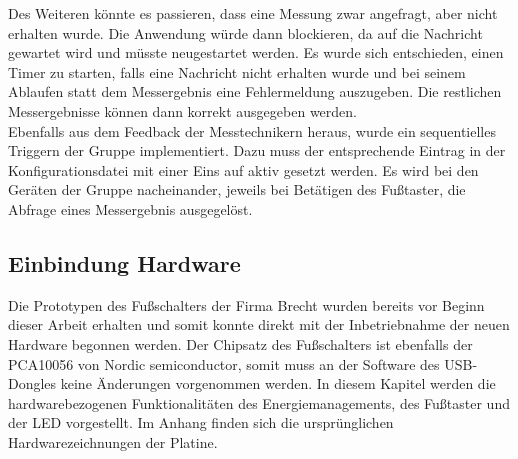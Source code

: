 Des Weiteren könnte es passieren, dass eine Messung zwar angefragt, aber nicht erhalten wurde. Die Anwendung würde dann blockieren, da auf die Nachricht gewartet wird und müsste neugestartet werden. Es wurde sich entschieden, einen Timer zu starten, falls eine Nachricht nicht erhalten wurde und bei seinem Ablaufen statt dem Messergebnis eine Fehlermeldung auszugeben. Die restlichen Messergebnisse können dann korrekt ausgegeben werden.\\
Ebenfalls aus dem Feedback der Messtechnikern heraus, wurde ein sequentielles Triggern der Gruppe implementiert. Dazu muss der entsprechende Eintrag in der Konfigurationsdatei mit einer Eins auf aktiv gesetzt werden. Es wird bei den Geräten der Gruppe nacheinander, jeweils bei Betätigen des Fußtaster, die Abfrage eines Messergebnis ausgegelöst.

\subsection{Einbindung Hardware}
\label{EinbindungHardware}
Die Prototypen des Fußschalters der Firma Brecht wurden bereits vor Beginn dieser Arbeit erhalten und somit konnte direkt mit der Inbetriebnahme der neuen Hardware begonnen werden. Der Chipsatz des Fußschalters ist ebenfalls der PCA10056 von Nordic semiconductor, somit muss an der Software des \ac{USB}-Dongles keine Änderungen vorgenommen werden. In diesem Kapitel werden die hardwarebezogenen Funktionalitäten des Energiemanagements, des Fußtaster und der \ac{LED} vorgestellt. Im Anhang finden sich die ursprünglichen Hardwarezeichnungen der Platine.

